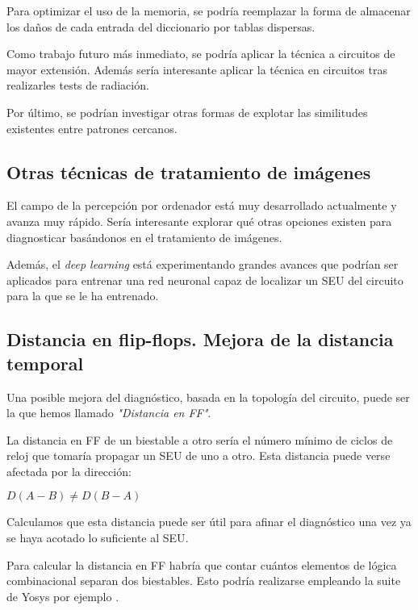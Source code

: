 Para optimizar el uso de la memoria, se podría reemplazar la forma de almacenar
los daños de cada entrada del diccionario por tablas dispersas.

Como trabajo futuro más inmediato, se podría aplicar la técnica a circuitos de
mayor extensión. Además sería interesante aplicar la técnica en circuitos tras
realizarles tests de radiación.

Por último, se podrían investigar otras formas de explotar las similitudes
existentes entre patrones cercanos.

\subsection{Otras técnicas de tratamiento de imágenes}
\label{subsec:OtrasTecnicasImag}
El campo de la percepción por ordenador está muy desarrollado actualmente y avanza
muy rápido. Sería interesante explorar qué otras opciones existen para
diagnosticar basándonos en el tratamiento de imágenes.



Además, el \textit{deep learning} está experimentando grandes avances que podrían ser
aplicados para entrenar una red neuronal capaz de localizar un \gls{SEU} del
circuito para la que se le ha entrenado.


\subsection{Distancia en flip-flops. Mejora de la distancia temporal}
\label{subsec:FFdist}
Una posible mejora del diagnóstico, basada en la topología del circuito, puede ser
la que hemos llamado \textit{"Distancia en FF"}.

La distancia en \gls{FF} de un biestable a otro sería el número mínimo de ciclos
de reloj que tomaría propagar un \gls{SEU} de uno a otro. Esta distancia puede
verse afectada por la dirección: 

\begin{center}
    $D(A-B) \neq D(B-A)$
\end{center}

Calculamos que esta distancia puede ser útil para afinar el diagnóstico una vez ya
se haya acotado lo suficiente al \gls{SEU}.

Para calcular la distancia en FF habría que contar cuántos elementos de lógica
combinacional separan dos biestables. Esto podría realizarse empleando la suite de 
Yosys por ejemplo \cite{YOSYS}.

\endinput

